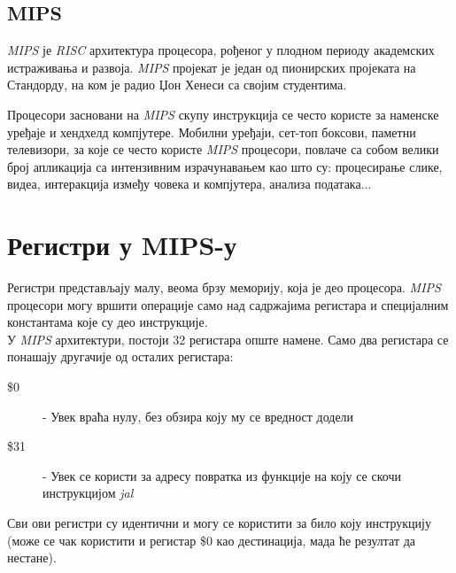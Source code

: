 \documentclass[12pt,oneside]{memoir}
\begin{document}
\subsection{MIPS}
\indent \textit{MIPS} је \textit{RISC} архитектура процесора, рођеног у плодном периоду академских истраживања и развоја. \textit{MIPS} пројекат је један од пионирских пројеката на Стандорду, на ком је радио Џон Хенеси са својим студентима.

\indent Процесори засновани на \textit{MIPS} скупу инструкција се често користе за наменске уређаје и хендхелд компјутере. Мобилни уређаји, сет-топ боксови, паметни телевизори, за које се често користе \textit{MIPS} процесори, повлаче са собом велики број апликација са интензивним израчунавањем као што су: процесирање слике, видеа, интеракција између човека и
компјутера, анализа података...

\section{Регистри у MIPS-у}

\indent Регистри представљају малу, веома брзу меморију, која је део процесора. \textit{MIPS} процесори могу вршити операције само над садржајима регистара и специјалним константама које су део инструкције. \\
\indent У \textit{MIPS} архитектури, постоји 32 регистара опште намене. Само два регистара се понашају другачије од осталих регистара:

\begin{description}
  \item[\$0] - Увек враћа нулу, без обзира коју му се вредност додели
  \item [\$31] - Увек се користи за адресу повратка из функције на коју се скочи инструкцијом \textit{jal}
\end{description}
Сви ови регистри су идентични и могу се користити за било коју инструкцију (може се чак користити и регистар \$0 као дестинација, мада ће резултат да нестане). 
\end{document}
